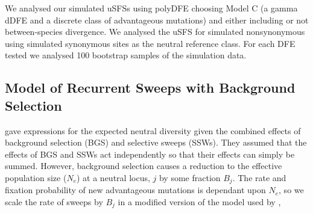 	 We analysed our simulated uSFSs using polyDFE choosing Model C (a gamma dDFE and a discrete class of advantageous mutations) and either including or not  between-species divergence. We analysed the uSFS for simulated nonsynonymous using simulated synonymous sites as the neutral reference class. For each DFE tested we analysed 100 bootstrap samples of the simulation data.
 
 	
	\subsection{Model of Recurrent Sweeps with Background Selection}

	
	\cite{RN323} gave expressions for the expected neutral diversity given the combined effects of background selection (BGS) and selective sweeps (SSWs). They assumed that the effects of BGS and SSWs act independently so that their effects can simply be summed. However, background selection causes a reduction to the effective population size ($N_e$) at a neutral locus, $j$ by some fraction $B_j$. The rate and fixation probability of new advantageous mutations is dependant upon $N_e$, so we scale the rate of sweeps by $B_j$ in a modified version of the model used by \cite{RN323},
	
